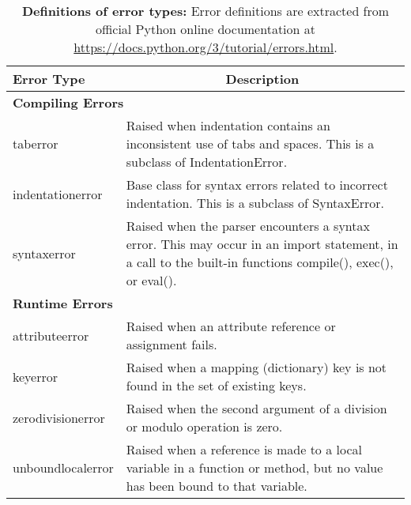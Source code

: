 \documentclass{article}
\begin{document}
\begin{table}[t]
\centering
\small
\caption{
\textbf{Definitions of error types:}
Error definitions are extracted from official Python online documentation at \url{https://docs.python.org/3/tutorial/errors.html}.
}
\label{app_tab:error_definition}
\begin{tabular}{p{}p{}}
\hline
\textbf{Error Type}        & \multicolumn{1}{c}{\textbf{Description}}                                                                                                                            \\
\hline
\multicolumn{2}{l}{\textbf{Compiling Errors}}                                                                                                                                            \\
taberror          & Raised when indentation contains an inconsistent use of tabs and spaces. This is a subclass of IndentationError.                                           \\
indentationerror  & Base class for syntax errors related to incorrect indentation. This is a subclass of SyntaxError.                                                          \\
syntaxerror       & Raised when the parser encounters a syntax error. This may occur in an import statement, in a call to the built-in functions compile(), exec(), or eval(). \\
\hline
\multicolumn{2}{l}{\textbf{Runtime Errors}}                                                                                                                                              \\
attributeerror    & Raised when an attribute reference or assignment fails.                                                                                                    \\
keyerror          & Raised when a mapping (dictionary) key is not found in the set of existing keys.                                                                           \\
zerodivisionerror & Raised when the second argument of a division or modulo operation is zero.                                                                                 \\
unboundlocalerror & Raised when a reference is made to a local variable in a function or method, but no value has been bound to that variable.                                 \\

\end{tabular}
\end{table}
\end{document}

